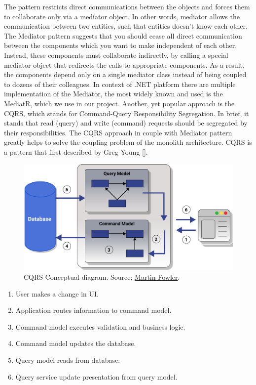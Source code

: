 The pattern restricts direct communications between the objects and forces them to collaborate only via a mediator object.
In other words, mediator allows the communication between two entities, such that entities doesn't know each other.
The Mediator pattern suggests that you should cease all direct communication between the components which you want to make
independent of each other.
Instead, these components must collaborate indirectly, by calling a special mediator object that redirects the calls to
appropriate components.
As a result, the components depend only on a single mediator class instead of being coupled to dozens of their colleagues.
In context of .NET platform there are multiple implementation of the Mediator, the most widely known and used is the
\href{https://github.com/jbogard/MediatR}{MediatR}, which we use in our project.
Another, yet popular approach is the CQRS, which stands for Command-Query Responsibility Segregation.
In brief, it stands that read (query) and write (command) requests should be segregated by their responsibilities.
The CQRS approach in couple with Mediator pattern greatly helps to solve the coupling problem of the monolith architecture.
CQRS is a pattern that first described by Greg Young [\cite{young2010cqrs}].

\begin{figure}[H]
    \centering
    \includegraphics[width=1\textwidth]{Pictures/cqrs.pdf}
    \caption{CQRS Conceptual diagram.
    Source: \href{https://martinfowler.com/bliki/CQRS.html}{Martin Fowler}.}
    \label{fig:figure}
\end{figure}

\begin{enumerate}
    \item User makes a change in UI\@.
    \item Application routes information to command model.
    \item Command model executes validation and business logic.
    \item Command model updates the database.
    \item Query model reads from database.
    \item Query service update presentation from query model.
\end{enumerate}

